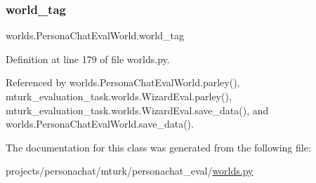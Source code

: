 \subsubsection{\texorpdfstring{world\+\_\+tag}{world\_tag}}
{\footnotesize\ttfamily worlds.\+Persona\+Chat\+Eval\+World.\+world\+\_\+tag}



Definition at line 179 of file worlds.\+py.



Referenced by worlds.\+Persona\+Chat\+Eval\+World.\+parley(), mturk\+\_\+evaluation\+\_\+task.\+worlds.\+Wizard\+Eval.\+parley(), mturk\+\_\+evaluation\+\_\+task.\+worlds.\+Wizard\+Eval.\+save\+\_\+data(), and worlds.\+Persona\+Chat\+Eval\+World.\+save\+\_\+data().



The documentation for this class was generated from the following file\+:\begin{DoxyCompactItemize}
\item 
projects/personachat/mturk/personachat\+\_\+eval/\hyperlink{projects_2personachat_2mturk_2personachat__eval_2worlds_8py}{worlds.\+py}\end{DoxyCompactItemize}
